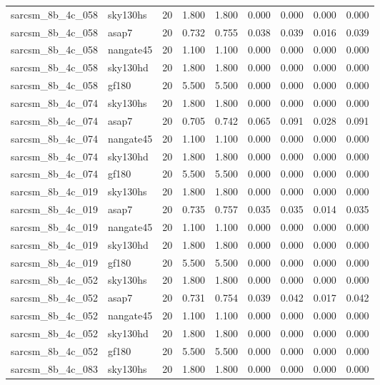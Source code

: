 \begin{tabular}{llrrrrrrr}
sarcsm\_8b\_4c\_058 & sky130hs & 20 & 1.800 & 1.800 & 0.000 & 0.000 & 0.000 & 0.000 \\
sarcsm\_8b\_4c\_058 & asap7 & 20 & 0.732 & 0.755 & 0.038 & 0.039 & 0.016 & 0.039 \\
sarcsm\_8b\_4c\_058 & nangate45 & 20 & 1.100 & 1.100 & 0.000 & 0.000 & 0.000 & 0.000 \\
sarcsm\_8b\_4c\_058 & sky130hd & 20 & 1.800 & 1.800 & 0.000 & 0.000 & 0.000 & 0.000 \\
sarcsm\_8b\_4c\_058 & gf180 & 20 & 5.500 & 5.500 & 0.000 & 0.000 & 0.000 & 0.000 \\
sarcsm\_8b\_4c\_074 & sky130hs & 20 & 1.800 & 1.800 & 0.000 & 0.000 & 0.000 & 0.000 \\
sarcsm\_8b\_4c\_074 & asap7 & 20 & 0.705 & 0.742 & 0.065 & 0.091 & 0.028 & 0.091 \\
sarcsm\_8b\_4c\_074 & nangate45 & 20 & 1.100 & 1.100 & 0.000 & 0.000 & 0.000 & 0.000 \\
sarcsm\_8b\_4c\_074 & sky130hd & 20 & 1.800 & 1.800 & 0.000 & 0.000 & 0.000 & 0.000 \\
sarcsm\_8b\_4c\_074 & gf180 & 20 & 5.500 & 5.500 & 0.000 & 0.000 & 0.000 & 0.000 \\
sarcsm\_8b\_4c\_019 & sky130hs & 20 & 1.800 & 1.800 & 0.000 & 0.000 & 0.000 & 0.000 \\
sarcsm\_8b\_4c\_019 & asap7 & 20 & 0.735 & 0.757 & 0.035 & 0.035 & 0.014 & 0.035 \\
sarcsm\_8b\_4c\_019 & nangate45 & 20 & 1.100 & 1.100 & 0.000 & 0.000 & 0.000 & 0.000 \\
sarcsm\_8b\_4c\_019 & sky130hd & 20 & 1.800 & 1.800 & 0.000 & 0.000 & 0.000 & 0.000 \\
sarcsm\_8b\_4c\_019 & gf180 & 20 & 5.500 & 5.500 & 0.000 & 0.000 & 0.000 & 0.000 \\
sarcsm\_8b\_4c\_052 & sky130hs & 20 & 1.800 & 1.800 & 0.000 & 0.000 & 0.000 & 0.000 \\
sarcsm\_8b\_4c\_052 & asap7 & 20 & 0.731 & 0.754 & 0.039 & 0.042 & 0.017 & 0.042 \\
sarcsm\_8b\_4c\_052 & nangate45 & 20 & 1.100 & 1.100 & 0.000 & 0.000 & 0.000 & 0.000 \\
sarcsm\_8b\_4c\_052 & sky130hd & 20 & 1.800 & 1.800 & 0.000 & 0.000 & 0.000 & 0.000 \\
sarcsm\_8b\_4c\_052 & gf180 & 20 & 5.500 & 5.500 & 0.000 & 0.000 & 0.000 & 0.000 \\
sarcsm\_8b\_4c\_083 & sky130hs & 20 & 1.800 & 1.800 & 0.000 & 0.000 & 0.000 & 0.000 \\

\end{tabular}
